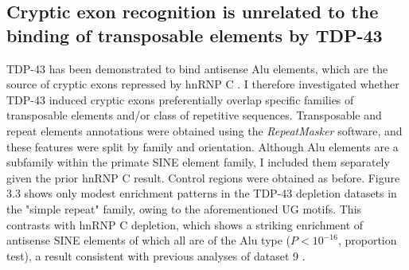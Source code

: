\subsection{Cryptic exon recognition is unrelated to the binding of transposable elements by TDP-43}
TDP-43 has been demonstrated to bind antisense Alu elements, which are the source of cryptic exons repressed by hnRNP C \citep{Kelley2014-sr,Zarnack2013-nv}. I therefore investigated whether TDP-43 induced cryptic exons preferentially overlap specific families of transposable elements and/or class of repetitive sequences. Transposable and repeat elements annotations were obtained using the \emph{RepeatMasker} software, and these features were split by family and orientation. Although Alu elements are a subfamily within the primate SINE element family, I included them separately given the prior hnRNP C result.
Control regions were obtained as before. Figure 3.3 shows only modest enrichment patterns in the TDP-43 depletion datasets in the "simple repeat" family, owing to the aforementioned UG motifs. This contrasts with hnRNP C depletion, which shows a striking enrichment of antisense SINE elements of which all are of the Alu type ($P < 10^{-16}$, proportion test), a result consistent with previous analyses of dataset 9 \citep{Zarnack2013-nv}.

